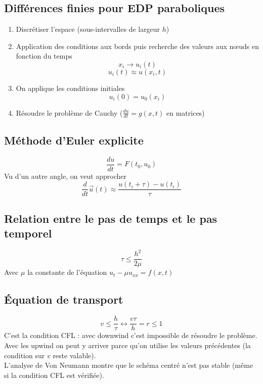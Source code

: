 \documentclass[resume]{subfiles}
\begin{document}
\subsection{Différences finies pour EDP paraboliques}
\begin{enumerate}
\item Discrétiser l'espace (sous-intervalles de largeur $h$)
\item Application des conditions aux bords puis recherche des valeurs aux nœuds en fonction du temps
$$x_i\to u_i(t)$$
$$u_i(t)\approx u(x_i,t)$$
\item On applique les conditions initiales
$$u_i(0)=u_0(x_i)$$
\item Résoudre le problème de Cauchy ($\frac{du}{dt}=g(x,t)$ en matrices)
\end{enumerate}
\subsection{Méthode d'Euler explicite}
$$\frac{du}{dt}=F(t_0,u_0)$$
Vu d'un autre angle, on veut approcher
$$\frac{d}{dt}\vec{u}(t)\approx \frac{u(t_i+\tau)-u(t_i)}{\tau}$$
\subsection{Relation entre le pas de temps et le pas temporel}
$$\tau\leq \frac{h^2}{2\mu}$$
Avec $\mu$ la constante de l'équation $u_t-\mu u_{xx}=f(x,t)$
\subsection{Équation de transport}
$$v\leq \frac{h}{\tau}\longleftrightarrow \frac{v\tau}{h}=r\leq 1$$
C'est la condition CFL : avec downwind c'est impossible de résoudre le problème. Avec les upwind on peut y arriver parce qu'on utilise les valeurs précédentes (la condition sur $v$ reste valable).\\
L'analyse de Von Neumann montre que le schéma centré n'est pas stable (même si la condition CFL est vérifiée).
\end{document}
